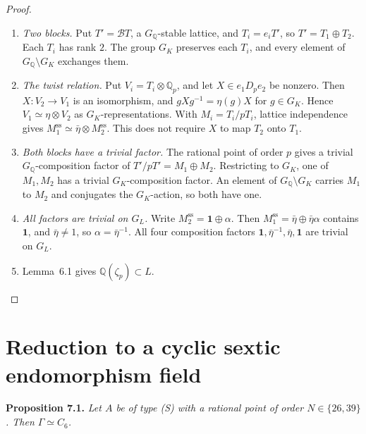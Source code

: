 \documentclass[11pt]{article}
\newcommand{\Q}{\mathbb Q}
\begin{document}
\begin{proof}
\begin{enumerate}
\item \emph{Two blocks.} Put \(T'=\mathcal BT\), a \(G_{\Q}\)-stable
lattice, and \(T_i=e_iT'\), so \(T'=T_1\oplus T_2\). Each \(T_i\) has
rank \(2\). The group \(G_K\) preserves each \(T_i\), and every element
of \(G_{\Q}\setminus G_K\) exchanges them.
\item \emph{The twist relation.} Put \(V_i=T_i\otimes\Q_p\), and let
\(X\in e_1D_pe_2\) be nonzero. Then \(X:V_2\to V_1\) is an
isomorphism, and \(gXg^{-1}=\eta(g)X\) for \(g\in G_K\). Hence
\(V_1\simeq\eta\otimes V_2\) as \(G_K\)-representations. With
\(M_i=T_i/pT_i\), lattice independence gives
\(M_1^{\mathrm{ss}}\simeq\bar\eta\otimes M_2^{\mathrm{ss}}\). This does
not require \(X\) to map \(T_2\) onto \(T_1\).
\item \emph{Both blocks have a trivial factor.} The rational point of
order \(p\) gives a trivial \(G_{\Q}\)-composition factor of
\(T'/pT'=M_1\oplus M_2\). Restricting to \(G_K\), one of \(M_1,M_2\)
has a trivial \(G_K\)-composition factor. An element of
\(G_{\Q}\setminus G_K\) carries \(M_1\) to \(M_2\) and conjugates the
\(G_K\)-action, so both have one.
\item \emph{All factors are trivial on \(G_L\).} Write
\(M_2^{\mathrm{ss}}=\mathbf1\oplus\alpha\). Then
\(M_1^{\mathrm{ss}}=\bar\eta\oplus\bar\eta\alpha\) contains
\(\mathbf1\), and \(\bar\eta\ne1\), so \(\alpha=\bar\eta^{-1}\). All
four composition factors \(\mathbf1,\bar\eta^{-1},\bar\eta,\mathbf1\)
are trivial on \(G_L\).
\item Lemma~6.1 gives \(\Q(\zeta_p)\subset L\).\qedhere
\end{enumerate}
\end{proof}

\section{Reduction to a cyclic sextic endomorphism field}

\noindent\textbf{Proposition 7.1.}
\emph{Let \(A\) be of type (S) with a rational point of order
\(N\in\{26,39\}\). Then \(\Gamma\simeq C_6\).}
\end{document}
